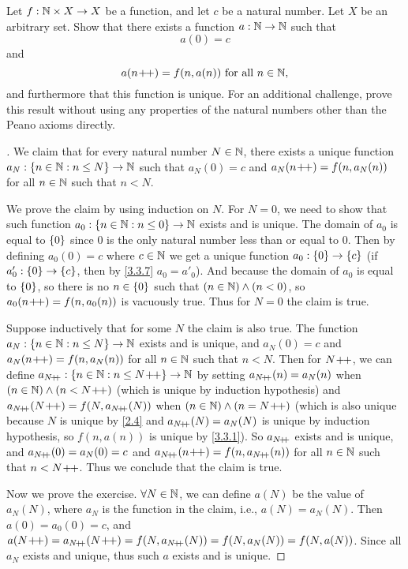 \begin{ex}\label{ex:3.5.12}
	Let \(f : \mathbb{N} \times X \to X\) be a function, and let \(c\) be a natural number.
	Let \(X\) be an arbitrary set.
	Show that there exists a function \(a : \mathbb{N} \to \mathbb{N}\) such that
	\[
		a(0) = c
	\]
	and
	\[
		a(n\!+\!\!+) = f(n, a(n)) \text{ for all } n \in \mathbb{N},
	\]
	and furthermore that this function is unique.
	For an additional challenge, prove this result without using any properties of the natural numbers other than the Peano axioms directly.
\end{ex}

\begin{proof}[]
	We claim that for every natural number \(N \in \mathbb{N}\), there exists a unique function \(a_N : \left\lbrace n \in \mathbb{N} : n \leq N\right\rbrace \to \mathbb{N}\) such that \(a_N(0) = c\) and \(a_N(n\!+\!\!+) = f(n, a_{N}(n))\) for all \(n \in \mathbb{N}\) such that \(n < N\).

	We prove the claim by using induction on \(N\).
	For \(N = 0\), we need to show that such function \(a_0 : \left\lbrace n \in \mathbb{N} : n \leq 0\right\rbrace \to \mathbb{N}\) exists and is unique.
	The domain of \(a_0\) is equal to \(\left\lbrace0\right\rbrace\) since \(0\) is the only natural number less than or equal to \(0\).
	Then by defining \(a_0(0) = c\) where \(c \in \mathbb{N}\) we get a unique function \(a_0 : \left\lbrace0\right\rbrace \to \left\lbrace c\right\rbrace\) (if \(a'_0 : \left\lbrace0\right\rbrace \to \left\lbrace c\right\rbrace\), then by \cref{3.3.7} \(a_0 = a'_0\)).
	And because the domain of \(a_0\) is equal to \(\left\lbrace0\right\rbrace\), so there is no \(n \in \left\lbrace0\right\rbrace\) such that \((n \in \mathbb{N}) \land (n < 0)\), so \(a_0(n\!+\!\!+) = f(n, a_0(n))\) is vacuously true.
	Thus for \(N = 0\) the claim is true.

	Suppose inductively that for some \(N\) the claim is also true.
	The function \(a_N : \left\lbrace n \in \mathbb{N} : n \leq N\right\rbrace \to \mathbb{N}\) exists and is unique, and \(a_N(0) = c\) and \(a_N(n\!+\!\!+) = f(n, a_N(n))\) for all \(n \in \mathbb{N}\) such that \(n < N\).
	Then for \(N\!+\!\!+\), we can define \(a_{N\!+\!\!+} : \left\lbrace n \in \mathbb{N} : n \leq N\!+\!\!+\right\rbrace \to \mathbb{N}\) by setting \(a_{N\!+\!\!+}(n) = a_N(n)\) when \((n \in \mathbb{N}) \land (n < N\!+\!\!+)\) (which is unique by induction hypothesis) and \(a_{N\pp}(N\pp) = f(N, a_{N\pp}(N))\) when \((n \in \mathbb{N}) \land (n = N\!+\!\!+)\) (which is also unique because \(N\) is unique by \cref{2.4} and \(a_{N\!+\!\!+}(N) = a_N(N)\) is unique by induction hypothesis, so \(f(n, a(n))\) is unique by \cref{3.3.1}).
	So \(a_{N\!+\!\!+}\) exists and is unique, and \(a_{N\!+\!\!+}(0) = a_N(0) = c\) and \(a_{N\pp}(n\pp) = f(n, a_{N\pp}(n))\) for all \(n \in \mathbb{N}\) such that \(n < N\!+\!\!+\).
	Thus we conclude that the claim is true.

	Now we prove the exercise.
	\(\forall N \in \mathbb{N}\), we can define \(a(N)\) be the value of \(a_N(N)\), where \(a_N\) is the function in the claim, i.e., \(a(N) = a_{N}(N)\).
	Then \(a(0) = a_0(0) = c\), and \(a(N\pp) = a_{N\pp}(N\pp) = f(N, a_{N\pp}(N)) = f(N, a_{N}(N)) = f(N, a(N))\).
	Since all \(a_N\) exists and unique, thus such \(a\) exists and is unique.


\end{proof}
